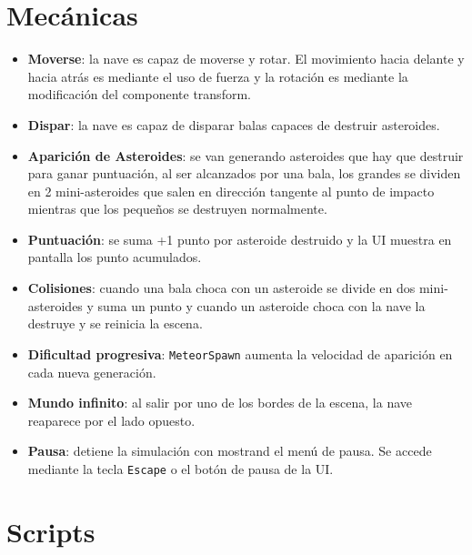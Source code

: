 \documentclass[12pt,twoside,letterpaper]{article}
\begin{document}
\section{Mecánicas}

\begin{itemize}
    \item \textbf{Moverse}: la nave es capaz de moverse y rotar. El movimiento hacia delante y hacia atrás es mediante el uso de fuerza y la rotación es mediante la modificación del componente transform.
    \item \textbf{Dispar}: la nave es capaz de disparar balas capaces de destruir asteroides.
    \item \textbf{Aparición de Asteroides}: se van generando asteroides que hay que destruir para ganar puntuación, al ser alcanzados por una bala, los grandes se dividen en 2 mini-asteroides que salen en dirección tangente al punto de impacto mientras que los pequeños se destruyen normalmente.
    \item \textbf{Puntuación}: se suma +1 punto por asteroide destruido y la UI muestra en pantalla los punto acumulados.
    \item \textbf{Colisiones}: cuando una bala choca con un asteroide se divide en dos mini-asteroides y suma un punto y cuando un asteroide choca con la nave la destruye y se reinicia la escena.
    \item \textbf{Dificultad progresiva}: \texttt{MeteorSpawn} aumenta la velocidad de aparición en cada nueva generación.
    \item \textbf{Mundo infinito}: al salir por uno de los bordes de la escena, la nave reaparece por el lado opuesto.
    \item \textbf{Pausa}: detiene la simulación con mostrand el menú de pausa. Se accede mediante la tecla \texttt{Escape} o el botón de pausa de la UI.
\end{itemize}

\section{Scripts}
\end{document}
